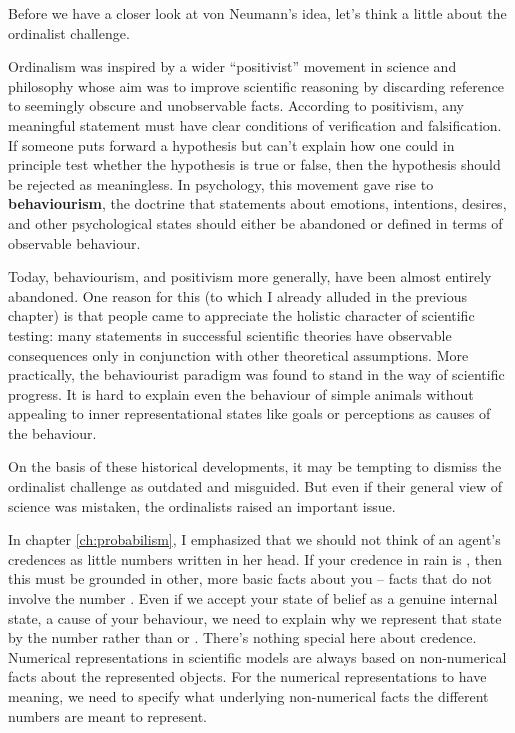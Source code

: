 Before we have a closer look at von Neumann's idea, let's think a little about
the ordinalist challenge.

Ordinalism was inspired by a wider ``positivist'' movement in science
and philosophy whose aim was to improve scientific reasoning by
discarding reference to seemingly obscure and unobservable facts.
According to positivism, any meaningful statement must have clear
conditions of verification and falsification. If someone puts forward
a hypothesis but can't explain how one could in principle test whether
the hypothesis is true or false, then the hypothesis should be
rejected as meaningless. In psychology, this movement gave rise to
\textbf{behaviourism}, the doctrine that statements about emotions,
intentions, desires, and other psychological states should either be
abandoned or defined in terms of observable behaviour.

Today, behaviourism, and positivism more generally, have been almost
entirely abandoned. One reason for this (to which I already alluded in
the previous chapter) is that people came to appreciate the holistic
character of scientific testing: many statements in successful
scientific theories have observable consequences only in conjunction
with other theoretical assumptions.%
%
More practically, the behaviourist paradigm was found to stand in the
way of scientific progress. It is hard to explain even the behaviour
of simple animals without appealing to inner representational states
like goals or perceptions as causes of the behaviour.

On the basis of these historical developments, it may be tempting to dismiss the
ordinalist challenge as outdated and misguided. But even if their general view
of science was mistaken, the ordinalists raised an important issue.

In chapter \ref{ch:probabilism}, I emphasized that we should not think
of an agent's credences as little numbers written in her head. If your
credence in rain is , then this must be grounded in
other, more basic facts about you -- facts that do not involve the
number . Even if we accept your state of belief as a
genuine internal state, a cause of your behaviour, we need to explain
why we represent that state by the number  rather than
 or . There's nothing special here
about credence. Numerical representations in scientific models are
always based on non-numerical facts about the represented objects. For
the numerical representations to have meaning, we need to specify what
underlying non-numerical facts the different numbers are meant to
represent.

